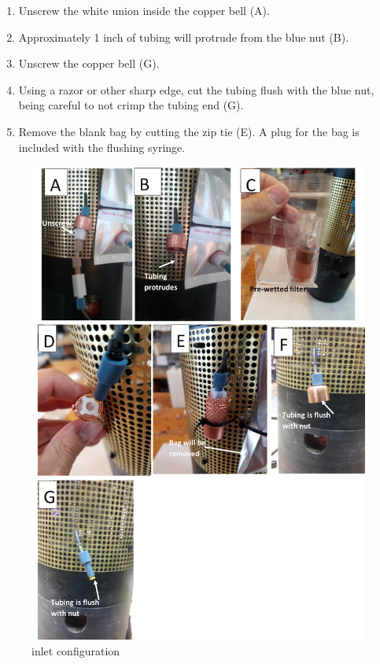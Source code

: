\begin{enumerate}
\item
Unscrew the white union inside the copper bell (A).
\item
Approximately 1 inch of tubing will protrude from the blue nut (B).
\item
Unscrew the copper bell (G).
\item
Using a razor or other sharp edge, cut the tubing flush with the blue nut, being careful to not crimp the tubing end (G).
\item
Remove the blank bag by cutting the zip tie (E).  A plug for the bag is included with the flushing syringe.
\end{enumerate}

\begin{figure}
\centering
\includegraphics[width=1.0\textwidth]{figs/Filter_Fig.png}
\caption{\instType{} inlet configuration}
\label{fig:FilterFig}
\end{figure}


